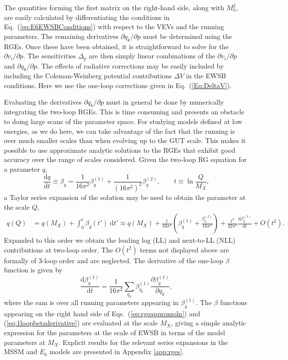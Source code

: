 \documentclass[preprint,amsmath,amssymb,aps,superscriptaddress,prd,
showpacs,floatfix,nofootinbib]{revtex4-1}
\begin{document}
The quantities forming the first matrix on the right-hand side, along
with $M_h^2$, are easily calculated by differentiating the conditions
in Eq.~(\ref{eq:E6EWSBConditions}) with respect to the VEVs and the
running parameters.  The remaining derivatives $\partial q_k /\partial
p$ must be determined using the RGEs.  Once these have been obtained,
it is straightforward to solve for the $\partial v_i / \partial p$.
The sensitivities $\Delta_p$ are then simply linear combinations of
the $\partial v_i / \partial p$ and $\partial q_k / \partial p$.  The
effects of radiative corrections may be easily included by including
the Coleman-Weinberg potential contributions $\Delta V$ in the EWSB
conditions.  Here we use the one-loop corrections given in
Eq.~(\ref{Eq:DeltaV}).

Evaluating the derivatives $\partial q_k / \partial p$ must in general be
done by numerically integrating the two-loop RGEs.  This is time consuming
and presents an obstacle to doing large scans of the parameter space.  For
studying models defined at low energies, as we do here, we can take advantage
of the fact that the running is over much smaller scales than when
evolving up to the GUT scale.  This makes it possible to use approximate
analytic solutions to the RGEs that exhibit good accuracy over the range of
scales considered.  Given the two-loop RG equation for a parameter $q$,
\begin{equation} \label{eq:rge}
\frac{\textrm{d}q}{\mathrm{d}t} \equiv \beta_q = \frac{1}{16\pi^2}
\beta_q^{(1)} + \frac{1}{(16\pi^2)^2} \beta_q^{(2)} , \qquad t \equiv
\ln \frac{Q}{M_X} ,
\end{equation}
a Taylor series expansion of the solution may be used to obtain the
parameter at the scale $Q$,
\begin{align} \label{eq:rgeapproxsoln}
q(Q) &= q(M_X) + \int_0^t \beta_q(t') \; \textrm{d}t' \approx q(M_X) +
\frac{t}{16\pi^2} \left ( \beta_q^{(1)} + \frac{\beta_q^{(2)}}{16\pi^2}
\right ) + \frac{t^2}{32\pi^2} \frac{\textrm{d}\beta_q^{(1)}}{\textrm{d}t}
+ O(t^2) .
\end{align}
Expanded to this order we obtain the leading log (LL) and next-to-LL
(NLL) contributions at two-loop order.  The $O(t^2)$ terms
not displayed above are formally of 3-loop order and are
neglected. The derivative of the one-loop $\beta$ function is given by
\begin{equation} \label{eq:1loopbetaderivative}
\frac{\textrm{d}\beta_q^{(1)}}{\textrm{d}t} = \frac{1}{16\pi^2} \sum_{q_k}
\beta_{q_k}^{(1)} \frac{\partial \beta_q^{(1)}}{\partial q_k} ,
\end{equation}
where the sum is over all running parameters appearing in
$\beta_q^{(1)}$.  The $\beta$ functions appearing on the right hand side of
Eqs.~(\ref{eq:rgeapproxsoln}) and (\ref{eq:1loopbetaderivative}) are
evaluated at the scale $M_X$, giving a simple analytic expression for the
parameters at the scale of EWSB in terms of the model parameters at $M_X$.
Explicit results for the relevant series expansions in the MSSM and $E_6$
models are presented in Appendix \ref{app:rges}.
\end{document}
